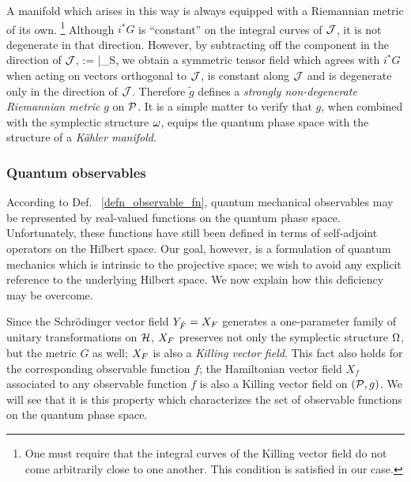 A manifold which arises in this way is always equipped with a
Riemannian metric of its own.%
%
\footnote{One must require that the integral curves of the Killing 
vector field do not come arbitrarily close to one another. This condition
is satisfied in our case.}
%
Although $i^*G$ is ``constant'' on the integral curves of $\J$, it is
not degenerate in that direction.  However, by subtracting off the
component in the direction of $\J$,
%
\be \label{g_defined}
 := \bigg|_S,
\ee
%
we obtain a symmetric tensor field which agrees with $i^*G$ when
acting on vectors orthogonal to $\J$, is constant along $\J$ and is
degenerate only in the direction of $\J$.  Therefore $\tilde{g}$
defines a {\it strongly non-degenerate Riemannian metric} $g$ on $\P$.
It is a simple matter to verify that $g$, when combined with the
symplectic structure $\w$, equips the quantum phase space with the
structure of a {\em K\"ahler manifold}.


\subsubsection{Quantum observables}

According to Def. ~\ref{defn_observable_fn}, quantum mechanical
observables may be represented by real-valued functions on the quantum
phase space.  Unfortunately, these functions have still been defined
in terms of self-adjoint operators on the Hilbert space.  Our goal,
however, is a formulation of quantum mechanics which is intrinsic to
the projective space; we wish to avoid any explicit reference to the
underlying Hilbert space.  We now explain how this deficiency may be
overcome.

Since the Schr\"odinger vector field $Y_{\hat{F}} = \hvf{F}$ generates
a one-parameter family of unitary transformations on $\H$, $\hvf{F}$
preserves not only the symplectic structure $\W$, but the metric $G$
as well; $\hvf{F}$ is also a {\em Killing vector field}.  This fact
also holds for the corresponding observable function $f$; the
Hamiltonian vector field $X_f$ associated to any observable function
$f$ is also a Killing vector field on $(\P, g)$.  We will see that it
is this property which characterizes the set of observable functions
on the quantum phase space.

